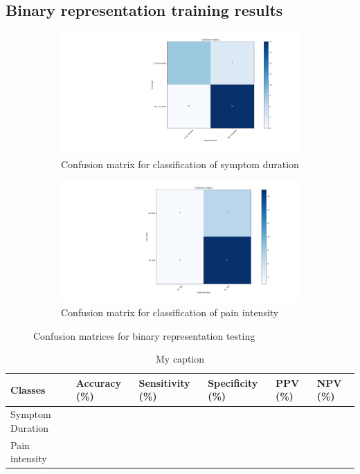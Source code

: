 \documentclass[12pt,a4paper]{article}
\begin{document}
\subsection{Binary representation training results}

\begin{figure}[H]
  \begin{subfigure}[b]{0.45\textwidth}
    \includegraphics[width=\textwidth]{figures/bdura2cla}
    \caption{Confusion matrix for classification of symptom duration}
    \label{fig:f11}
  \end{subfigure}
  \hfill
  \begin{subfigure}[b]{0.45\textwidth}
    \includegraphics[width=\textwidth]{figures/bpain2cla}
    \caption{Confusion matrix for classification of pain intensity}
    \label{fig:f22}
  \end{subfigure}
  \caption{Confusion matrices for binary representation testing}
\end{figure}



\begin{table}[H]
\centering
\begin{tabular}{|p{2cm}|p{2.2cm}|p{2.2cm}|p{2.2cm}|p{2cm}|p{2cm}|}
\hline
Classes          & Accuracy (\%) & Sensitivity (\%) & Specificity (\%) & PPV (\%) & NPV (\%) \\ \hline
Symptom Duration &                    &                      &                       &               &               \\ \hline
Pain intensity   &                    &                      &                       &               &               \\ \hline
\end{tabular}
\label{my-label}
\caption{My caption}
\end{table}
\end{document}
